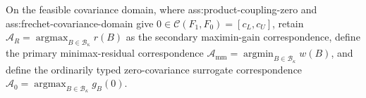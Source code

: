On the feasible covariance domain, where ass:product-coupling-zero and ass:frechet-covariance-domain give \(0\in\mathcal C(F_1,F_0)=[c_L,c_U]\), retain \(\mathcal A_R=\operatorname*{argmax}_{B\in\mathcal B_\kappa}r(B)\) as the secondary maximin-gain correspondence, define the primary minimax-residual correspondence \(\mathcal A_{\mathrm{mm}}=\operatorname*{argmin}_{B\in\mathcal B_\kappa}w(B)\), and define the ordinarily typed zero-covariance surrogate correspondence \(\mathcal A_0=\operatorname*{argmax}_{B\in\mathcal B_\kappa}g_B(0)\).